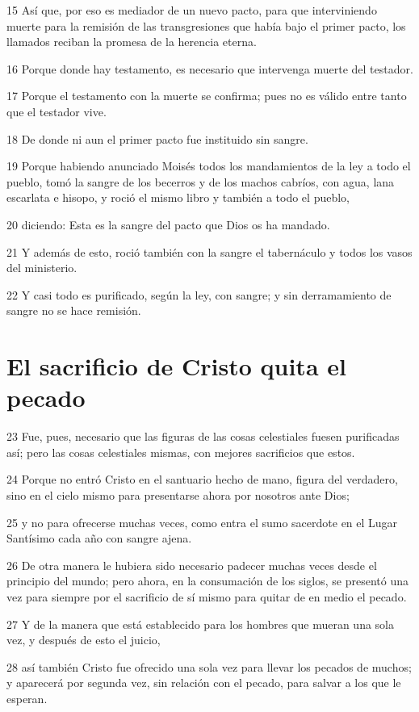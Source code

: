 \par 15 Así que, por eso es mediador de un nuevo pacto, para que interviniendo muerte para la remisión de las transgresiones que había bajo el primer pacto, los llamados reciban la promesa de la herencia eterna.
\par 16 Porque donde hay testamento, es necesario que intervenga muerte del testador.
\par 17 Porque el testamento con la muerte se confirma; pues no es válido entre tanto que el testador vive.
\par 18 De donde ni aun el primer pacto fue instituido sin sangre.
\par 19 Porque habiendo anunciado Moisés todos los mandamientos de la ley a todo el pueblo, tomó la sangre de los becerros y de los machos cabríos, con agua, lana escarlata e hisopo, y roció el mismo libro y también a todo el pueblo,
\par 20 diciendo: Esta es la sangre del pacto que Dios os ha mandado.
\par 21 Y además de esto, roció también con la sangre el tabernáculo y todos los vasos del ministerio.
\par 22 Y casi todo es purificado, según la ley, con sangre; y sin derramamiento de sangre no se hace remisión.

\section*{El sacrificio de Cristo quita el pecado}

\par 23 Fue, pues, necesario que las figuras de las cosas celestiales fuesen purificadas así; pero las cosas celestiales mismas, con mejores sacrificios que estos.
\par 24 Porque no entró Cristo en el santuario hecho de mano, figura del verdadero, sino en el cielo mismo para presentarse ahora por nosotros ante Dios;
\par 25 y no para ofrecerse muchas veces, como entra el sumo sacerdote en el Lugar Santísimo cada año con sangre ajena.
\par 26 De otra manera le hubiera sido necesario padecer muchas veces desde el principio del mundo; pero ahora, en la consumación de los siglos, se presentó una vez para siempre por el sacrificio de sí mismo para quitar de en medio el pecado.
\par 27 Y de la manera que está establecido para los hombres que mueran una sola vez, y después de esto el juicio,
\par 28 así también Cristo fue ofrecido una sola vez para llevar los pecados de muchos; y aparecerá por segunda vez, sin relación con el pecado, para salvar a los que le esperan.

